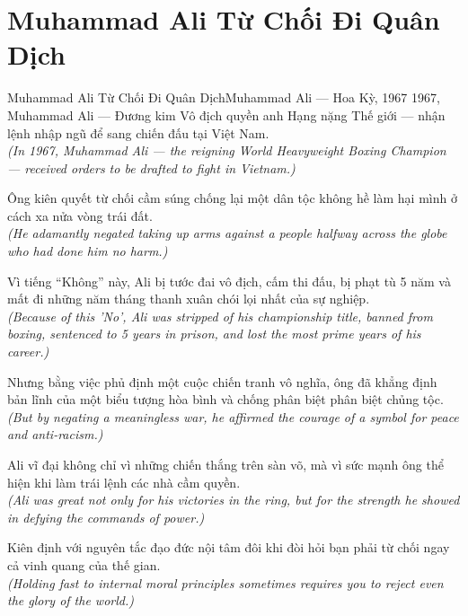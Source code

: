 \section{Muhammad Ali Từ Chối Đi Quân Dịch}
\begin{truyen}{Muhammad Ali Từ Chối Đi Quân Dịch}{Muhammad Ali --- Hoa Kỳ, 1967}
 1967, Muhammad Ali --- Đương kim Vô địch quyền anh Hạng nặng Thế giới --- nhận lệnh nhập ngũ để sang chiến đấu tại Việt Nam.\\[4pt]
\textit{(In 1967, Muhammad Ali --- the reigning World Heavyweight Boxing Champion --- received orders to be drafted to fight in Vietnam.)}

Ông kiên quyết từ chối cầm súng chống lại một dân tộc không hề làm hại mình ở cách xa nửa vòng trái đất.\\[4pt]
\textit{(He adamantly negated taking up arms against a people halfway across the globe who had done him no harm.)}

Vì tiếng ``Không'' này, Ali bị tước đai vô địch, cấm thi đấu, bị phạt tù 5 năm và mất đi những năm tháng thanh xuân chói lọi nhất của sự nghiệp.\\[4pt]
\textit{(Because of this 'No', Ali was stripped of his championship title, banned from boxing, sentenced to 5 years in prison, and lost the most prime years of his career.)}

Nhưng bằng việc phủ định một cuộc chiến tranh vô nghĩa, ông đã khẳng định bản lĩnh của một biểu tượng hòa bình và chống phân biệt phân biệt chủng tộc.\\[4pt]
\textit{(But by negating a meaningless war, he affirmed the courage of a symbol for peace and anti-racism.)}

Ali vĩ đại không chỉ vì những chiến thắng trên sàn võ, mà vì sức mạnh ông thể hiện khi làm trái lệnh các nhà cầm quyền.\\[4pt]
\textit{(Ali was great not only for his victories in the ring, but for the strength he showed in defying the commands of power.)}

\end{truyen}
\begin{baihoc}
  Kiên định với nguyên tắc đạo đức nội tâm đôi khi đòi hỏi bạn phải từ chối ngay cả vinh quang của thế gian.\\[4pt]
  \textit{(Holding fast to internal moral principles sometimes requires you to reject even the glory of the world.)}
\end{baihoc}

